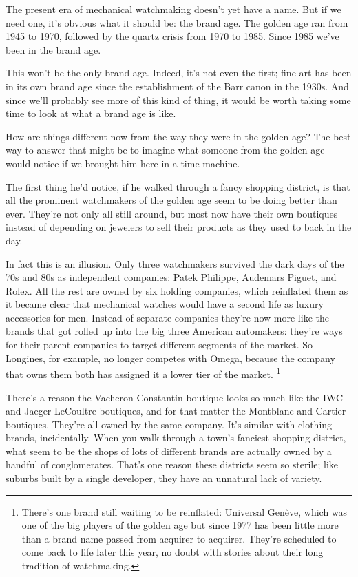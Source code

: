 The present era of mechanical watchmaking doesn't yet have a name. But
if we need one, it's obvious what it should be: the brand age. The
golden age ran from 1945 to 1970, followed by the quartz crisis from
1970 to 1985. Since 1985 we've been in the brand age.

This won't be the only brand age. Indeed, it's not even the first; fine
art has been in its own brand age since the establishment of the Barr
canon in the 1930s. And since we'll probably see more of this kind of
thing, it would be worth taking some time to look at what a brand age is
like.

How are things different now from the way they were in the golden age?
The best way to answer that might be to imagine what someone from the
golden age would notice if we brought him here in a time machine.

The first thing he'd notice, if he walked through a fancy shopping
district, is that all the prominent watchmakers of the golden age seem
to be doing better than ever. They're not only all still around, but
most now have their own boutiques instead of depending on jewelers to
sell their products as they used to back in the day.

In fact this is an illusion. Only three watchmakers survived the dark
days of the 70s and 80s as independent companies: Patek Philippe,
Audemars Piguet, and Rolex. All the rest are owned by six holding
companies, which reinflated them as it became clear that mechanical
watches would have a second life as luxury accessories for men. Instead
of separate companies they're now more like the brands that got rolled
up into the big three American automakers: they're ways for their parent
companies to target different segments of the market. So Longines, for
example, no longer competes with Omega, because the company that owns
them both has assigned it a lower tier of the market.
\footnote{There's one brand still waiting to be reinflated: Universal
Genève, which was one of the big players of the golden age but since
1977 has been little more than a brand name passed from acquirer to
acquirer. They're scheduled to come back to life later this year, no
doubt with stories about their long tradition of watchmaking.}

There's a reason the Vacheron Constantin boutique looks so much like the
IWC and Jaeger-LeCoultre boutiques, and for that matter the Montblanc
and Cartier boutiques. They're all owned by the same company. It's
similar with clothing brands, incidentally. When you walk through a
town's fanciest shopping district, what seem to be the shops of lots of
different brands are actually owned by a handful of conglomerates.
That's one reason these districts seem so sterile; like suburbs built by
a single developer, they have an unnatural lack of variety.

